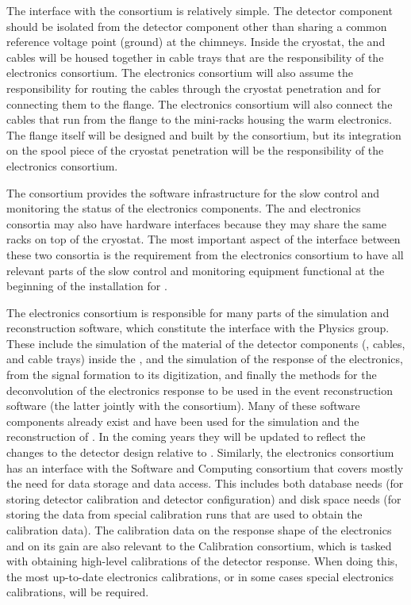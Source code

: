 The interface with the  consortium is relatively simple.
The  detector component should be isolated from the 
detector component other than sharing a common reference 
voltage point (ground) at the chimneys. Inside the cryostat, the 
 and  cables will be housed together in
cable trays that are the responsibility of the  electronics
consortium. The  electronics consortium will also assume
the responsibility for routing the  cables through the
cryostat penetration and for connecting them to the 
flange. The  electronics consortium will also connect
the cables that run from the flange
to the mini-racks housing the  warm electronics. 
The flange itself will be designed and built by the 
consortium, but its integration on the spool piece
of the cryostat penetration will be the responsibility of the  electronics
consortium.

The  consortium provides the software infrastructure for the slow
control and monitoring the status of the  electronics components.
The  and  electronics consortia may also have hardware
interfaces because they may share the same racks on top of the
cryostat. The most important aspect of the interface between these
two consortia is the requirement from the  electronics consortium
to have all relevant parts of the slow control and monitoring
equipment functional at the beginning
of the installation for . 

The  electronics consortium is responsible for many parts of
the  simulation and reconstruction software, which constitute
the interface with the Physics group. These include the
simulation of the material of the detector components (, cables, and
cable trays) inside the , and the simulation
of the response of the electronics, from the signal formation to its 
digitization, and finally the methods for the deconvolution of the electronics
response to be used in the event reconstruction software (the latter jointly
with the  consortium). Many of these
software components already exist and have been used for the simulation
and the reconstruction of . In the coming years they will be
updated to reflect the changes to the detector design relative to 
. Similarly, the 
electronics consortium has an interface with the Software and Computing
consortium that covers mostly the need for data storage and data access.
This includes both database needs (for storing detector calibration
and detector configuration) and disk space needs (for storing the data 
from special calibration runs that are used to obtain the calibration
data). The calibration data on the response shape of the electronics and
on its gain are also relevant to the Calibration consortium,
which is tasked with obtaining high-level calibrations of the detector
response. When doing this, the most up-to-date electronics calibrations,
or in some cases special electronics calibrations, will be required.
